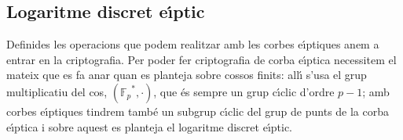 \documentclass[12pt,twoside,catalan,a4paper]{book}%
\numberwithin{figure}{section}		%
\theoremstyle{definition}   			%
\def\ce{corba e\lgem{}\'{\i}ptica}%
\def\ces{corbes e\lgem{}\'{\i}ptiques}%
\def\cf{cos finit}%
\def\cfs{cossos finits}%
\def\sgc{subgrup c\'{\i}clic}%
\def\ecdlp{logaritme discret e\lgem{}\'{\i}ptic}%
\newcommand{\A}{\ensuremath{\mathbb{A}_{2}}}%
\newcommand{\Proy}{\ensuremath{\mathbb{P}_{2}}}%
\newcommand{\Fp}{\ensuremath{\mathbb{F}_p}}%
\newcommand{\EFp}{\ensuremath{E(\mathbb{F}_p)}}%
\theoremstyle{saltolinea}   			%
\begin{document}
% 
% 
% 
% 
% 

\subsection{Logaritme discret e\lgem{}\'{\i}ptic}

Definides les operacions que podem realitzar amb les \ces{} anem a entrar en la criptografia. Per poder fer criptografia de \ce{} necessitem el mateix que es fa anar quan es planteja sobre \cfs{}:  all\'{\i} s'usa el grup multiplicatiu del cos, $\left(\Fp^*,\cdot\right)$, que \'es sempre un grup c\'{\i}clic d'ordre $p-1$; amb \ces{} tindrem tamb\'e un \sgc{} del grup de punts de la \ce{} i sobre aquest es planteja el \ecdlp{}.
\end{document}
